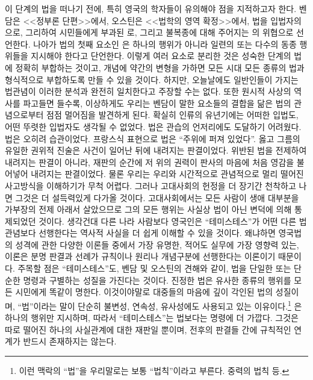 이 단계의 법을 떠나기 전에,
특히 영국의 학자들이 유의해야 점을 지적하고자 한다.
벤담은 <<정부론 단편>>에서,
오스틴은 <<법학의 영역 확정>>에서,
법을 입법자의 으로,
그리하여 시민들에게 부과된 로,
그리고 불복종에 대해 주어지는 의 위협으로 선언한다.
나아가 법의 첫째 요소인 은 하나의 행위가 아니라
일련의 또는 다수의 동종 행위들을 지시해야 한다고 단언한다.
이렇게 여러 요소로 분리한 것은 성숙한 단계의 법에 정확히 부합하는 것이고,
개념에 약간의 변형을 가하면 모든 시대 모든 종류의 법과
형식적으로 부합하도록 만들 수 있을 것이다.
하지만, 오늘날에도 일반인들이 가지는 법관념이
이러한 분석과 완전히 일치한다고 주장할 수는 없다.
또한 원시적 사상의 역사를 파고들면 들수록, 이상하게도 우리는
벤담이 말한 요소들의 결합을 닮은 법의 관념으로부터 점점 멀어짐을 발견하게 된다.
확실히 인류의 유년기에는 어떠한 입법도, 어떤 뚜렷한 입법자도 생각될 수 없었다.
법은 관습의 언저리에도 도달하기 어려웠다.
법은 오히려 습관이었다.
프랑스식 표현으로 법은 ``주위에 퍼져 있었다''.
옳고 그름의 유일한 권위적 진술은 사건이 일어난 뒤에 내려지는 판결이었다.
위반된 법을 전제하여 내려지는 판결이 아니라,
재판의 순간에 저 위의 권력이 판사의 마음에
처음 영감을 불어넣어 내려지는 판결이었다.
물론 우리는 우리와 시간적으로 관념적으로 멀리 떨어진 사고방식을
이해하기가 무척 어렵다.
그러나 고대사회의 헌정을 더 장기간 천착하고 나면 그것은 더 설득력있게
다가올 것이다.
고대사회에서는 모든 사람이
생애 대부분을 가부장의 전제 아래서 살았으므로
그의 모든 행위는 사실상 법이 아닌 변덕에 의해 통제되었던 것이다.
생각건대 다른 나라 사람보다 영국인은
``테미스테스''가
어떤 다른 법 관념보다
선행한다는 역사적 사실을 더 쉽게 이해할 수 있을 것이다.
왜냐하면 영국법의 성격에 관한 다양한 이론들 중에서
가장 유명한, 적어도 실무에 가장 영향력 있는, 이론은 분명
판결과 선례가 규칙이나 원리나 개념구분에 선행한다는 이론이기 때문이다.
주목할 점은 ``테미스테스''도,
벤담 및 오스틴의 견해와 같이,
법을 단일한 또는 단순한 명령과 구별하는 성질을 가진다는 것이다.
진정한 법은 유사한 종류의 행위를 모든 시민에게 똑같이 명한다.
이것이야말로 대중들의 마음에 깊이 각인된 법의 성질이며,
``법''이라는 말이 단순히 불변성, 연속성, 유사성에도 사용되고 있는
이유이다.\footnote{이런 맥락의 ``법''을 우리말로는 보통 ``법칙''이라고 부른다.
중력의 법칙 등.}
은 하나의 행위만 지시하며,
따라서 ``테미스테스''는 법보다는 명령에 더 가깝다.
그것은 따로 떨어진 하나의 사실관계에 대한 재판일 뿐이며,
전후의 판결들 간에 규칙적인 연계가 반드시 존재하지는 않는다.

